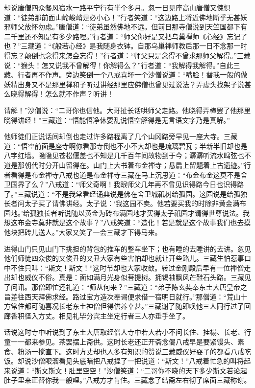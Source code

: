 \documentclass[12pt,UTF8]{ctexbook}
\begin{document}
{	却说唐僧四众餐风宿水一路平宁行有半个多月。忽一日见座高山唐僧又悚惧道：“徒弟那前面山岭峻峭是必小心！”行者笑道：“这边路上将近佛地断乎无甚妖邪师父放怀勿虑。”唐僧道：“徒弟虽然佛地不远。但前日那寺僧说到天竺国都下有二千里还不知是有多少路哩。”行者道：“师父你好是又把乌巢禅师《心经》忘记了也？”三藏道：“《般若心经》是我随身衣钵。自那乌巢禅师教后那一日不念那一时得忘？颠倒也念得来怎会忘得！”行者道：“师父只是念得不曾求那师父解得。”三藏说：“猴头！怎又说我不曾解得！你解得么？”行者道：“我解得我解得。”自此三藏、行者再不作声。旁边笑倒一个八戒喜坏一个沙僧说道：“嘴脸！替我一般的做妖精出身又不是那里禅和子听过讲经那里应佛僧也曾见过说法？弄虚头找架子说甚么晓得解得！怎么就不作声？听讲！
	
	请解！”沙僧说：“二哥你也信他。大哥扯长话哄师父走路。他晓得弄棒罢了他那里晓得讲经！”三藏道：“悟能悟净休要乱说悟空解得是无言语文字乃是真解。”
	
	他师徒们正说话间却倒也走过许多路程离了几个山冈路旁早见一座大寺。三藏道：“悟空前面是座寺啊你看那寺倒也不小不大却也是琉璃碧瓦；半新半旧却也是八字红墙。隐隐见苍松偃盖也不知是几千百年间故物到于今；潺潺听流水鸣弦也不道是那朝代时分开山留得在。山门上大书着布金禅寺；悬扁上留题着上古遗迹。”行者看得是布金禅寺八戒也道是布金禅寺三藏在马上沉思道：“布金布金这莫不是舍卫国界了么？”八戒道：“师父奇啊！我跟师父几年再不曾见识得路今日也识得路了。”三藏说道：“不是我常看经诵典说是佛在舍卫城祇树给孤园。这园说是给孤独长者问太子买了请佛讲经。太子说：‘我这园不卖。他若要买我的时除非黄金满布园地。’给孤独长者听说随以黄金为砖布满园地才买得太子祇园才请得世尊说法。我想这布金寺莫非就是这个故事？”八戒笑道：“造化！若是就是这个故事我们也去摸他块把砖儿送人。”大家又笑了一会三藏才下得马来。
	
	进得山门只见山门下挑担的背包的推车的整车坐下；也有睡的去睡讲的去讲。忽见他们师徒四众俊的又俊丑的又丑大家有些害怕却也就让开些路儿。三藏生怕惹事口中不住只叫：“斯文！斯文！”这时节却也大家收敛。转过金刚殿后早有一位禅僧走出却也威仪不俗。真是：面如满月光身似菩提树。拥锡袖飘风芒鞋石头路。三藏见了问讯。那僧即忙还礼道：“师从何来？”三藏道：“弟子陈玄奘奉东土大唐皇帝之旨差往西天拜佛求经。路过宝方造次奉谒便求借一宿明日就行。”那僧道：“荒山十方常住都可随喜况长老东土神僧但得供养幸甚。”三藏谢了随即唤他三人同行过了回廊香积径入方丈。相见礼毕分宾主坐定行者三人亦垂手坐了。
	
	话说这时寺中听说到了东土大唐取经僧人寺中若大若小不问长住、挂榻、长老、行童一一都来参见。茶罢摆上斋供。这时长老还正开斋念偈八戒早是要紧馒头、素食、粉汤一搅直下。这时方丈却也人多有知识的赞说三藏威仪好耍子的都看八戒吃饭。却说沙僧眼溜看见头底暗把八戒捏了一把说道：“斯文！”八戒着忙急的叫将起来说道：“斯文斯文！肚里空空！”沙僧笑道：“二哥你不晓的天下多少斯文若论起肚子里来正替你我一般哩。”八戒方才肯住。三藏念了结斋左右彻了席面三藏称谢。
	
}
\end{document}

